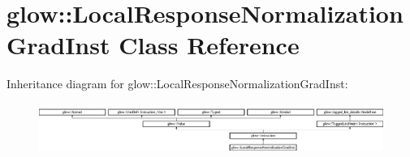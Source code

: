\hypertarget{classglow_1_1_local_response_normalization_grad_inst}{}\section{glow\+:\+:Local\+Response\+Normalization\+Grad\+Inst Class Reference}
\label{classglow_1_1_local_response_normalization_grad_inst}
Inheritance diagram for glow\+:\+:Local\+Response\+Normalization\+Grad\+Inst\+:\begin{figure}[H]
\begin{center}
\leavevmode
\includegraphics[height=1.716475cm]{classglow_1_1_local_response_normalization_grad_inst}
\end{center}
\end{figure}
